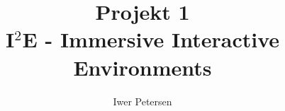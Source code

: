 \documentclass[twocolumn]{article}
\title{Projekt 1\\I$^2$E - Immersive Interactive Environments}
\author{Iwer Petersen}
\begin{document}
	\onecolumn
	\maketitle
	\newpage
	
	\tableofcontents
	\newpage
	
	\twocolumn
	
	
	
	
	
	
	
	\onecolumn
	\newpage	
	{}
	
\end{document}
